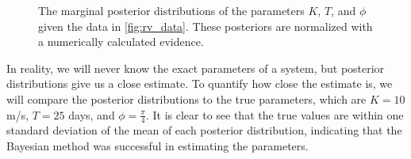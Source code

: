 \documentclass[preprint,longauthor]{aastex631}
\numberwithin{equation}{section}
\begin{document}
\begin{figure}[ht!]
\centering

\hfill
{}
\hfill
{}
\caption{The marginal posterior distributions of the parameters $K$, $T$, and $\phi$ given the data in \autoref{fig:rv_data}. These posteriors are normalized with a numerically calculated evidence.}
\label{fig:bf_posteriors}
\end{figure}

In reality, we will never know the exact parameters of a system, but posterior distributions give us a close estimate. To quantify how close the estimate is, we will compare the posterior distributions to the true parameters, which are $K=10$ m/s, $T=25$ days, and $\phi=\frac{\pi}{4}$. It is clear to see that the true values are within one standard deviation of the mean of each posterior distribution, indicating that the Bayesian method was successful in estimating the parameters.
\end{document}
